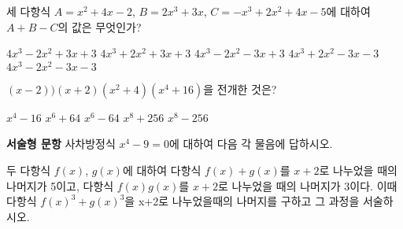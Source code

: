 \documentclass[11pt]{exam}
\begin{document}
%
%
%
\begin{questions}
	
\addpoints
\question[3] 세 다항식 $A=x^2+4x-2$, $B=2x^3+3x$, $C=-x^3+2x^2+4x-5$에 대하여 $A+B-C$의 값은 무엇인가? 

\begin{choices}
	\choice $4x^3-2x^2+3x+3$
	\choice $4x^3+2x^2+3x+3$
	\choice $4x^3-2x^2-3x+3$
	\choice $4x^3+2x^2-3x-3$
	\choice $4x^3-2x^2-3x-3$
\end{choices}
\vspace{1.0in}
\addpoints
\question[4] $(x-2))(x+2)(x^2+4)(x^4+16)$을 전개한 것은?
\begin{choices}
	\choice $x^4-16$
	\choice $x^6+64$
	\choice $x^6-64$
	\choice $x^8+256$
	\choice $x^8-256$
\end{choices}
\vspace{1.0in}

\newpage

\textbf{서술형 문항}
\addpoints
\question[6] 사차방정식 $x^4-9=0$에 대하여 다음 각 물음에 답하시오.
\noaddpoints %

\newpage
\addpoints
\question[8] 두 다항식 $f(x)$, $g(x)$에 대하여 다항식 $f(x) + g(x)$를 $x+2$로 나누었을 때의 나머지가 5이고, 다항식 $f(x)g(x)$를 $x+2$로 나누었을 때의 나머지가 3이다. 이때 다항식 ${f(x)}^3+{g(x)}^3$을 x+2로 나누었을때의 나머지를 구하고 그 과정을 서술하시오.
\vspace{4.0in}


\end{questions}
\end{document}
